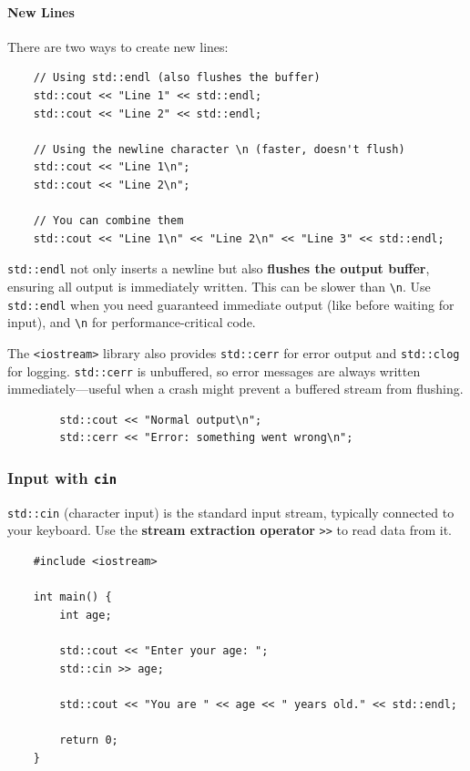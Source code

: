 \paragraph{New Lines}

There are two ways to create new lines:

\begin{lstlisting}
	// Using std::endl (also flushes the buffer)
	std::cout << "Line 1" << std::endl;
	std::cout << "Line 2" << std::endl;
	
	// Using the newline character \n (faster, doesn't flush)
	std::cout << "Line 1\n";
	std::cout << "Line 2\n";
	
	// You can combine them
	std::cout << "Line 1\n" << "Line 2\n" << "Line 3" << std::endl;
\end{lstlisting}

\begin{remark}
	\texttt{std::endl} not only inserts a newline but also \textbf{flushes the output buffer}, ensuring all output is immediately written. This can be slower than \texttt{\textbackslash{}n}. Use \texttt{std::endl} when you need guaranteed immediate output (like before waiting for input), and \texttt{\textbackslash{}n} for performance-critical code.
\end{remark}

\begin{remark}
	The \texttt{<iostream>} library also provides \texttt{std::cerr} for error output and \texttt{std::clog} for logging. \texttt{std::cerr} is unbuffered, so error messages are always written immediately—useful when a crash might prevent a buffered stream from flushing.

	\begin{lstlisting}
		std::cout << "Normal output\n";
		std::cerr << "Error: something went wrong\n";
	\end{lstlisting}
\end{remark}

\subsubsection{Input with \texttt{cin}}

\texttt{std::cin} (character input) is the standard input stream, typically connected to your keyboard. Use the \textbf{stream extraction operator} \texttt{>>} to read data from it.

\begin{lstlisting}
	#include <iostream>
	
	int main() {
		int age;
		
		std::cout << "Enter your age: ";
		std::cin >> age;
		
		std::cout << "You are " << age << " years old." << std::endl;
		
		return 0;
	}
\end{lstlisting}

